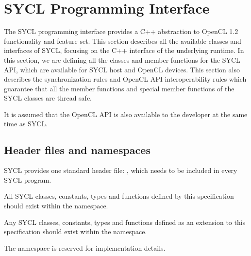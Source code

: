 %

\def \debugging{false}

\chapter{SYCL Programming Interface}
\label{chapter:sycl-programming-interface}

The SYCL programming interface provides a C++ abstraction to OpenCL
1.2 functionality and feature set. This section describes all the
available classes and interfaces of SYCL, focusing on the C++
interface of the underlying runtime. In this section, we are defining
all the classes and member functions for the SYCL API, which are available for
SYCL host and OpenCL devices. This section also describes the
synchronization rules and OpenCL API interoperability rules which
guarantee that all the member functions and special member functions of the SYCL
classes are thread safe.

It is assumed that the OpenCL API is also available to the developer
at the same time as SYCL.

\section{Header files and namespaces}
\label{sec:headers-and-namespaces}

SYCL provides one standard header file: ,
which needs to be included in every SYCL program.

All SYCL classes, constants, types and functions defined by this
specification should exist within the  namespace.

Any SYCL classes, constants, types and functions defined as an extension
to this specification should exist within the
 namespace.

The  namespace is reserved for
implementation details.


